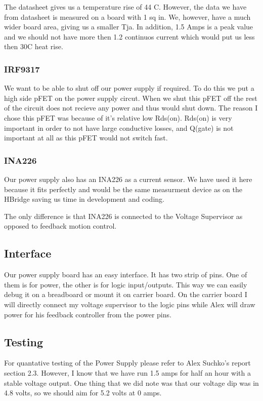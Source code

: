 \documentclass[12pt]{article}
\begin{document}
The datasheet gives us a temperature rise of 44 C. However, the data we have from datasheet is measured on a board with 1 sq in. We, however, have a much wider board area, giving us a smaller Tja. In addition, 1.5 Amps is a peak value and we should not have more then 1.2 continuos current which would put us less then 30C heat rise. 
\subsubsection{IRF9317}
We want to be able to shut off our power supply if required. To do this we put a high side pFET on the power supply circut. When we shut this pFET off the rest of the circuit does not recieve any power and thus would shut down. The reason I chose this pFET was because of it's relative low Rds(on). Rds(on) is very important in order to not have large conductive losses, and Q(gate) is not important at all as this pFET would not switch fast.
\subsubsection{INA226}
Our power supply also has an INA226 as a current sensor. We have used it here because it fits perfectly and would be the same measurment device as on the HBridge saving us time in development and coding. 

The only difference is that INA226 is connected to the Voltage Supervisor as opposed to feedback motion control.

\subsection{Interface}
Our power supply board has an easy interface. It has two strip of pins. One of them is for power, the other is for logic input/outputs. This way we can easily debug it on a breadboard or mount it on carrier board. On the carrier board I will directly connect my voltage supervisor to the logic pins while Alex will draw power for his feedback controller from the power pins.
\subsection{Testing}
For quantative testing of the Power Supply please refer to Alex Suchko's report section 2.3. However, I know that we have run 1.5 amps for half an hour with a stable voltage output. One thing that we did note was that our voltage dip was in 4.8 volts, so we should aim for 5.2 volts at 0 amps.
\end{document}
